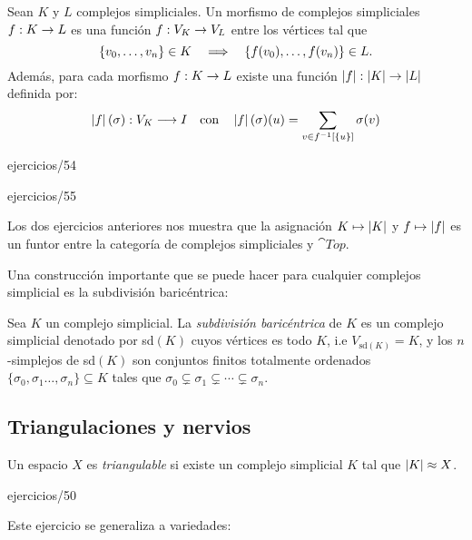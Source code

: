 \documentclass[../../topologia_algebraica]{subfiles}
\begin{document}
\begin{defin}
	Sean $K$ y $L$ complejos simpliciales. Un morfismo de complejos simpliciales $f:K\rightarrow L$
	es una funci\'on $f:V_K\rightarrow V_L$ entre los v\'ertices tal que
	\[
		\{v_0,\ldots,v_n\}\in K \quad\Longrightarrow\quad \{f(v_0),\ldots,f(v_n)\}\in L.
	\]
	Adem\'as, para cada morfismo $f:K\rightarrow L$ existe una funci\'on $\left| f \right|:\left| K \right|\rightarrow\left| L \right|$
	definida por:
	\[
		\left| f \right|(\sigma):V_K\longrightarrow I \quad\text{con}\quad
		\left| f \right|(\sigma)(u)=\sum_{v\in f^{-1}[\{u\}]}\sigma(v)
	\]
\end{defin}

{ejercicios/54} %

{ejercicios/55} %

\begin{nota}
	Los dos ejercicios anteriores nos muestra que la asignaci\'on $K \mapsto \left| K \right|$ y $f\mapsto \left| f \right|$
	es un funtor entre la categor\'ia de complejos simpliciales y $\cat{Top}$.
\end{nota}

Una construcci\'on importante que se puede hacer para cualquier complejos simplicial es la
subdivisi\'on baric\'entrica:

\begin{defin}
	Sea $K$ un complejo simplicial. La \emph{subdivisi\'on baric\'entrica} de $K$ es un complejo
	simplicial denotado por sd$(K)$ cuyos v\'ertices es todo $K$, i.e $V_{\text{sd}(K)}=K$, y los
	$n$-simplejos de sd$(K)$ son conjuntos finitos totalmente ordenados
	$\{\sigma_0,\sigma_1\ldots,\sigma_n\}\subseteq K$ tales que
	$\sigma_0\subsetneq\sigma_1\subsetneq\cdots\subsetneq\sigma_n$.
\end{defin}

\subsection{Triangulaciones y nervios}

\begin{defin}
  Un espacio $X$ es \emph{triangulable} si existe un complejo simplicial $K$ tal que
  $\left| K \right|\approx X$.
\end{defin}

{ejercicios/50} %

Este ejercicio se generaliza a variedades:
\end{document}
